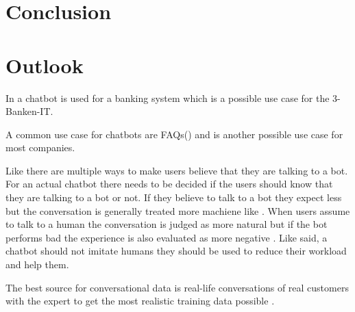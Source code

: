 \section{Conclusion}



\section{Outlook}
In \citet{singhbuilding} a chatbot is used for a banking system which is a possible use case for the 3-Banken-IT.

A common use case for chatbots are FAQs(\citet{evaluateChatbotsShawar2007, buiildChatbotsPython, huang2007extracting, GO2019304}) and is another possible use case for most companies.


Like \citet{GO2019304} there are multiple ways to make users believe that they are talking to a bot.
For an actual chatbot there needs to be decided if the users should know that they are talking to a bot or not.
If they believe to talk to a bot they expect less but the conversation is generally treated more machiene like \cite{GO2019304}.
When users assume to talk to a human the conversation is judged as more natural but if the bot performs bad 
the experience is also evaluated as more negative \cite{GO2019304}.
Like \citet{shawar2007chatbots} said, a chatbot should not imitate humans they should be used to 
reduce their workload and help them.

The best source for conversational data is real-life conversations of real customers with the expert to get the most realistic training data possible \cite{singhbuilding}.

